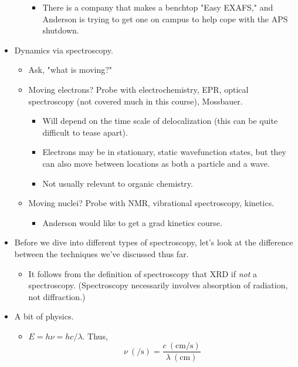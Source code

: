 \documentclass[../notes.tex]{subfiles}
\begin{document}
\begin{itemize}
\begin{itemize}
\begin{itemize}
            \item There is a company that makes a benchtop "Easy EXAFS," and Anderson is trying to get one on campus to help cope with the APS shutdown.
        \end{itemize}
    \end{itemize}
    \item Dynamics via spectroscopy.
    \begin{itemize}
        \item Ask, "what is moving?"
        \item Moving electrons? Probe with electrochemistry, EPR, optical spectroscopy (not covered much in this course), Mossbauer.
        \begin{itemize}
            \item Will depend on the time scale of delocalization (this can be quite difficult to tease apart).
            \item Electrons may be in stationary, static wavefunction states, but they can also move between locations as both a particle and a wave.
            \item Not usually relevant to organic chemistry.
        \end{itemize}
        \item Moving nuclei? Probe with NMR, vibrational spectroscopy, kinetics.
        \begin{itemize}
            \item Anderson would like to get a grad kinetics course.
        \end{itemize}
    \end{itemize}
    \item Before we dive into different types of spectroscopy, let's look at the difference between the techniques we've discussed thus far.
    \begin{itemize}
        \item It follows from the definition of spectroscopy that XRD if \emph{not} a spectroscopy. (Spectroscopy necessarily involves absorption of radiation, not diffraction.)
    \end{itemize}
    \item A bit of physics.
    \begin{itemize}
        \item $E=h\nu=hc/\lambda$. Thus,
        \begin{equation*}
            \nu\ (\si{\per\second}) = \frac{c\ (\si{\centi\meter\per\second})}{\lambda\ (\si{\centi\meter})}
        \end{equation*}

\end{itemize}
\end{itemize}
\end{document}
